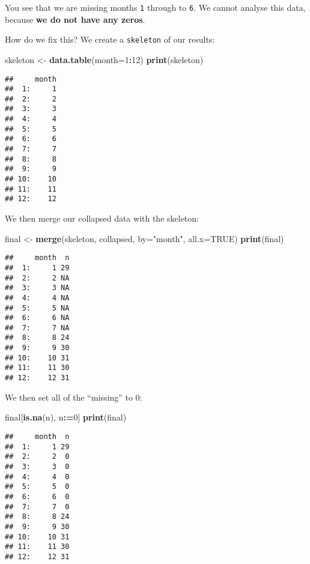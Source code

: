 \documentclass[]{book}
\newenvironment{Shaded}{\begin{snugshade}}{\end{snugshade}}
\newcommand{\KeywordTok}[1]{\textcolor[rgb]{0.13,0.29,0.53}{\textbf{#1}}}
\newcommand{\DataTypeTok}[1]{\textcolor[rgb]{0.13,0.29,0.53}{#1}}
\newcommand{\DecValTok}[1]{\textcolor[rgb]{0.00,0.00,0.81}{#1}}
\newcommand{\StringTok}[1]{\textcolor[rgb]{0.31,0.60,0.02}{#1}}
\newcommand{\OtherTok}[1]{\textcolor[rgb]{0.56,0.35,0.01}{#1}}
\newcommand{\OperatorTok}[1]{\textcolor[rgb]{0.81,0.36,0.00}{\textbf{#1}}}
\newcommand{\ErrorTok}[1]{\textcolor[rgb]{0.64,0.00,0.00}{\textbf{#1}}}
\newcommand{\NormalTok}[1]{#1}
\begin{document}
You see that we are missing months \texttt{1} through to \texttt{6}. We
cannot analyse this data, because \textbf{we do not have any zeros}.

How do we fix this? We create a \texttt{skeleton} of our results:

\begin{Shaded}
\begin{Highlighting}[]
\NormalTok{skeleton <-}\StringTok{ }\KeywordTok{data.table}\NormalTok{(}\DataTypeTok{month=}\DecValTok{1}\OperatorTok{:}\DecValTok{12}\NormalTok{)}
\KeywordTok{print}\NormalTok{(skeleton)}
\end{Highlighting}
\end{Shaded}

\begin{verbatim}
##     month
##  1:     1
##  2:     2
##  3:     3
##  4:     4
##  5:     5
##  6:     6
##  7:     7
##  8:     8
##  9:     9
## 10:    10
## 11:    11
## 12:    12
\end{verbatim}

We then merge our collapsed data with the skeleton:

\begin{Shaded}
\begin{Highlighting}[]
\NormalTok{final <-}\StringTok{ }\KeywordTok{merge}\NormalTok{(skeleton, collapsed, }\DataTypeTok{by=}\StringTok{"month"}\NormalTok{, }\DataTypeTok{all.x=}\OtherTok{TRUE}\NormalTok{)}
\KeywordTok{print}\NormalTok{(final)}
\end{Highlighting}
\end{Shaded}

\begin{verbatim}
##     month  n
##  1:     1 29
##  2:     2 NA
##  3:     3 NA
##  4:     4 NA
##  5:     5 NA
##  6:     6 NA
##  7:     7 NA
##  8:     8 24
##  9:     9 30
## 10:    10 31
## 11:    11 30
## 12:    12 31
\end{verbatim}

We then set all of the ``missing'' to 0:

\begin{Shaded}
\begin{Highlighting}[]
\NormalTok{final[}\KeywordTok{is.na}\NormalTok{(n), n}\OperatorTok{:}\ErrorTok{=}\DecValTok{0}\NormalTok{]}
\KeywordTok{print}\NormalTok{(final)}
\end{Highlighting}
\end{Shaded}

\begin{verbatim}
##     month  n
##  1:     1 29
##  2:     2  0
##  3:     3  0
##  4:     4  0
##  5:     5  0
##  6:     6  0
##  7:     7  0
##  8:     8 24
##  9:     9 30
## 10:    10 31
## 11:    11 30
## 12:    12 31
\end{verbatim}
\end{document}
